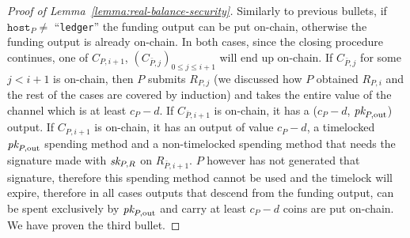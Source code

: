 \begin{proof}[Proof of Lemma~\ref{lemma:real-balance-security}]
  Similarly to previous bullets, if $\mathtt{host}_P \neq$ ``\texttt{ledger}'' the funding
  output can be put on-chain, otherwise the funding output is already on-chain.
  In both cases, since the closing procedure continues, one of $C_{P, i+1}$,
  $(C_{\bar{P}, j})_{0 \leq j \leq i+1}$ will end up on-chain. If $C_{\bar{P},
  j}$ for some $j < i+1$ is on-chain, then $P$ submits $R_{P, j}$ (we discussed
  how $P$ obtained $R_{P, i}$ and the rest of the cases are covered by
  induction) and takes the entire value of the channel which is at least $c_P -
  d$. If $C_{\bar{P}, i+1}$ is on-chain, it has a ($c_P - d$, $\textit{pk}_{P,
  \mathrm{out}}$) output. If $C_{P, i+1}$ is on-chain, it has an output of value
  $c_P - d$, a timelocked $\textit{pk}_{P, \mathrm{out}}$ spending method and a
  non-timelocked spending method that needs the signature made with $\textit{sk}_{P, R}$
  on $R_{\bar{P}, i+1}$. $P$ however has not generated that signature, therefore
  this spending method cannot be used and the timelock will expire, therefore in
  all cases outputs that descend from the funding output, can be spent
  exclusively by $\textit{pk}_{P, \mathrm{out}}$ and carry at least $c_P - d$ coins are
  put on-chain. We have proven the third bullet.


\end{proof}
